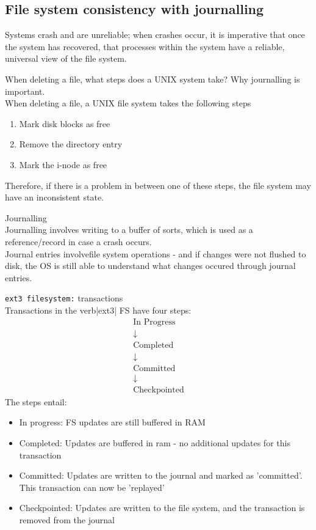 \documentclass[journal, letterpaper]{IEEEtran}
\begin{document}
\subsection{File system consistency with journalling}
Systems crash and are unreliable; when crashes occur, it is imperative that once the system has recovered, that processes within the system have a reliable, universal view of the file system.
\begin{example}{When deleting a file, what steps does a UNIX system take? Why journalling is important.} \\
    When deleting a file, a UNIX file system takes the following steps
    \begin{enumerate}
        \item Mark disk blocks as free
        \item Remove the directory entry
        \item Mark the i-node as free
    \end{enumerate}
    Therefore, if there is a problem in between one of these steps, the file system may have an inconsistent state.
\end{example}
\begin{theory}{Journalling} \\
    Journalling involves writing to a buffer of sorts, which is used as a reference/record in case a crash occurs.
    \newline \\ 
    Journal entries involvefile system operations - and if changes were not flushed to disk, the OS is still able to understand what changes occured through journal entries.
\end{theory}
\begin{aside}{\texttt{ext3 filesystem:} transactions} \\ 
    Transactions in the verb|ext3| FS have four steps:
    \begin{gather*}
        \text{In Progress} \\
        \downarrow \\
        \text{Completed} \\
        \downarrow \\
        \text{Committed} \\
        \downarrow \\
        \text{Checkpointed}
    \end{gather*}
    The steps entail:
    \begin{itemize}
        \item In progress: FS updates are still buffered in RAM 
        \item Completed: Updates are buffered in ram - no additional updates for this transaction
        \item Committed: Updates are written to the journal and marked as 'committed'. This transaction can now be 'replayed'
        \item Checkpointed: Updates are written to the file system, and the transaction is removed from the journal
    \end{itemize}
\end{aside}
\end{document}
